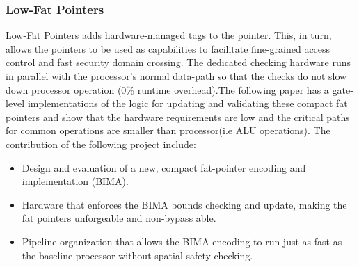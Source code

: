 
\subsubsection{Low-Fat Pointers}
Low-Fat Pointers\cite{LowFatPointer} adds hardware-managed tags to the pointer. 
This, in turn, allows the pointers to be used as capabilities to facilitate fine-grained 
access control and fast security domain crossing. The dedicated checking hardware runs in parallel 
with the processor's normal data-path so that the checks do not slow down processor operation 
(0\% runtime overhead).The following paper has a gate-level implementations of the logic for updating 
and validating these compact fat pointers and show that the hardware requirements are low 
and the critical paths for common operations are smaller than processor(i.e ALU operations).
The contribution of the following project include: 
\begin{itemize}
  \item Design and evaluation of a new, compact fat-pointer
  encoding and implementation (BIMA).
  \item Hardware that enforces the BIMA bounds checking and update, making the fat pointers 
  unforgeable and non-bypass able.
  \item Pipeline organization that allows the BIMA encoding to run just as fast as the baseline
   processor without spatial safety checking.
\end{itemize}






